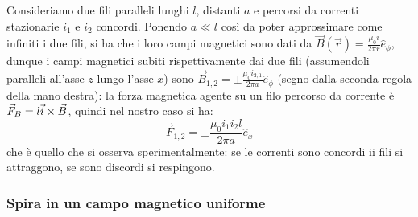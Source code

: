 Consideriamo due fili paralleli lunghi $ l $, distanti $ a $ e percorsi da correnti stazionarie $ i_1 $ e $ i_2 $ concordi. Ponendo $ a \ll l $ così da poter approssimare come infiniti i due fili, si ha che i loro campi magnetici sono dati da $ \vec{B}(\vec{r}) = \frac{\mu_0 i}{2\pi r} \hat{e}_{\phi} $, dunque i campi magnetici subiti rispettivamente dai due fili (assumendoli paralleli all'asse $ z $ lungo l'asse $ x $) sono $ \vec{B}_{1,2} = \pm \frac{\mu_0 i_{2,1}}{2\pi a} \hat{e}_{\phi} $ (segno dalla seconda regola della mano destra): la forza magnetica agente su un filo percorso da corrente è $ \vec{F}_B = l \vec{i}\times\vec{B} $, quindi nel nostro caso si ha:
\begin{equation}
	\vec{F}_{1,2} = \pm \frac{\mu_0 i_1 i_2 l}{2 \pi a} \hat{e}_x
	\label{eq:forza-fili}
\end{equation}
che è quello che si osserva sperimentalmente: se le correnti sono concordi ii fili si attraggono, se sono discordi si respingono.

\subsubsection{Spira in un campo magnetico uniforme}

